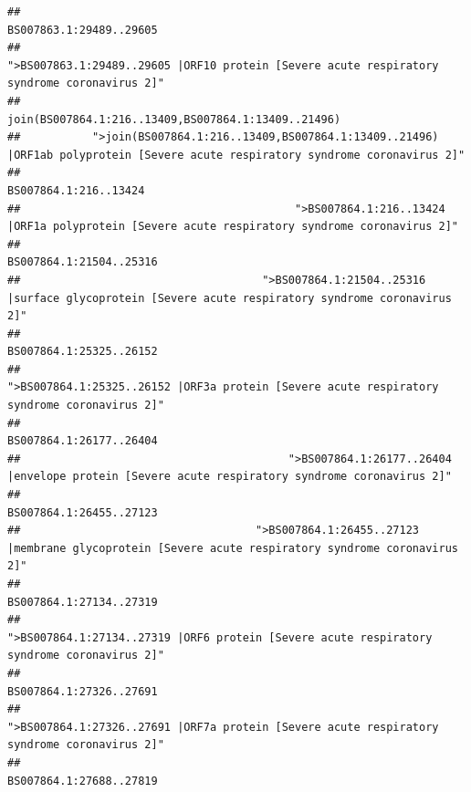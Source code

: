 \documentclass[
]{article}
\begin{document}
\begin{verbatim}
##                                                                                                                BS007863.1:29489..29605 
##                                            ">BS007863.1:29489..29605 |ORF10 protein [Severe acute respiratory syndrome coronavirus 2]" 
##                                                                                    join(BS007864.1:216..13409,BS007864.1:13409..21496) 
##           ">join(BS007864.1:216..13409,BS007864.1:13409..21496) |ORF1ab polyprotein [Severe acute respiratory syndrome coronavirus 2]" 
##                                                                                                                  BS007864.1:216..13424 
##                                          ">BS007864.1:216..13424 |ORF1a polyprotein [Severe acute respiratory syndrome coronavirus 2]" 
##                                                                                                                BS007864.1:21504..25316 
##                                     ">BS007864.1:21504..25316 |surface glycoprotein [Severe acute respiratory syndrome coronavirus 2]" 
##                                                                                                                BS007864.1:25325..26152 
##                                            ">BS007864.1:25325..26152 |ORF3a protein [Severe acute respiratory syndrome coronavirus 2]" 
##                                                                                                                BS007864.1:26177..26404 
##                                         ">BS007864.1:26177..26404 |envelope protein [Severe acute respiratory syndrome coronavirus 2]" 
##                                                                                                                BS007864.1:26455..27123 
##                                    ">BS007864.1:26455..27123 |membrane glycoprotein [Severe acute respiratory syndrome coronavirus 2]" 
##                                                                                                                BS007864.1:27134..27319 
##                                             ">BS007864.1:27134..27319 |ORF6 protein [Severe acute respiratory syndrome coronavirus 2]" 
##                                                                                                                BS007864.1:27326..27691 
##                                            ">BS007864.1:27326..27691 |ORF7a protein [Severe acute respiratory syndrome coronavirus 2]" 
##                                                                                                                BS007864.1:27688..27819 

\end{verbatim}
\end{document}
